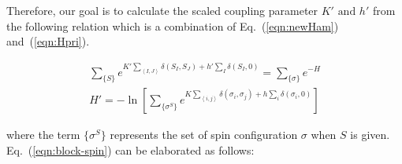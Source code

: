 \documentclass[%
 reprint,
 amsmath,amssymb,
 aps,
]{revtex4-2}
\begin{document}
Therefore, our goal is to calculate the scaled coupling parameter $K' \text{ and } h'$ from
the following relation which is a combination of Eq.~(\ref{eqn:newHam}) and~(\ref{eqn:Hpri}).

\begin{gather}
\sum_{\{S\}}e^{K'\sum_{\left<I,J\right>}\delta(S_{I}, S_{J}) +h'\sum_{I}\delta(S_{I},0)} = 
\sum_{\{\sigma\}}e^{-H} \\
H' = -\ln\left[\sum_{\{\sigma^{S}\}} e^{K\sum_{\left<i,j\right>}\delta(\sigma_{i}, \sigma_{j}) 
+h\sum_{i}\delta(\sigma_{i},0)}\right] \label{eqn:block-spin}
\end{gather}

where the term $\{\sigma^{S}\}$ represents the set of spin configuration $\sigma$ when 
$S$ is given. \\

Eq.~(\ref{eqn:block-spin}) can be elaborated as follows:
\end{document}
